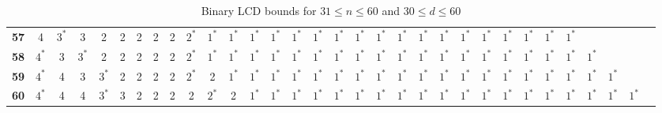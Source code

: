 \begin{sidewaystable}
\begin{tabular}{|c| c c c c c c c c c c c c c c c c c c c c c c c c c c c c c c c |}
\textbf{57} & 4 & $3^*$ & 3 & 2 & 2 & 2 & 2 & 2 & $2^*$ & $1^*$ & $1^*$ & $1^*$ & $1^*$ & $1^*$ & $1^*$ & $1^*$ & $1^*$ & $1^*$ & $1^*$ & $1^*$ & $1^*$ & $1^*$ & $1^*$ & $1^*$ & $1^*$ & $1^*$ & $1^*$ & & & & \\
\textbf{58} & $4^*$ & 3 & $3^*$ & 2 & 2 & 2 & 2 & 2 & $2^*$ & $1^*$ & $1^*$ & $1^*$ & $1^*$ & $1^*$ & $1^*$ & $1^*$ & $1^*$ & $1^*$ & $1^*$ & $1^*$ & $1^*$ & $1^*$ & $1^*$ & $1^*$ & $1^*$ & $1^*$ & $1^*$ & $1^*$ & & & \\
\textbf{59} & $4^*$ & 4 & 3 & $3^*$ & 2 & 2 & 2 & 2 & $2^*$ & 2 & $1^*$ & $1^*$ & $1^*$ & $1^*$ & $1^*$ & $1^*$ & $1^*$ & $1^*$ & $1^*$ & $1^*$ & $1^*$ & $1^*$ & $1^*$ & $1^*$ & $1^*$ & $1^*$ & $1^*$ & $1^*$ & $1^*$ & & \\
\textbf{60} & $4^*$ & 4 & 4 & $3^*$ & 3 & 2 & 2 & 2 & 2 & $2^*$ & 2 & $1^*$ & $1^*$ & $1^*$ & $1^*$ & $1^*$ & $1^*$ & $1^*$ & $1^*$ & $1^*$ & $1^*$ & $1^*$ & $1^*$ & $1^*$ & $1^*$ & $1^*$ & $1^*$ & $1^*$ & $1^*$ & $1^*$ & \\
\hline
\end{tabular}
\caption{Binary LCD bounds for $31 \leq n \leq 60$ and $30 \leq d \leq 60$}
\label{tab:lp_tables_q2_31_60_30_60}
\end{sidewaystable}